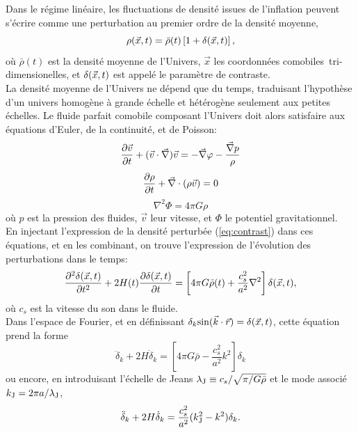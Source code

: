 Dans le régime linéaire, les fluctuations de densité issues de l'inflation peuvent s'écrire comme une perturbation au premier ordre de la densité moyenne,
\begin{equation}
    \label{eq:contrast}
    \rho(\vec{x}, t) = \bar{\rho}(t) \left[1 + \delta(\vec{x}, t) \right],
\end{equation}
où $\bar{\rho}(t)$ est la densité moyenne de l'Univers, $\vec{x}$ les coordonnées comobiles\footnotemark\ tri-dimensionelles, et $\delta(\vec{x}, t)$ est appelé le paramètre de contraste. \\
La densité moyenne de l'Univers ne dépend que du temps, traduisant l'hypothèse d'un univers homogène à grande échelle et hétérogène seulement aux petites échelles.
Le fluide parfait comobile composant l'Univers doit alors satisfaire aux équations d'Euler, de la continuité, et de Poisson:
\begin{equation}
    \frac{\partial \vec{v}}{\partial t} + (\vec{v} \cdot \vec{\nabla}) \vec{v} = -\vec{\nabla}\varphi - \frac{\vec{\nabla}p}{\rho} \label{eq:cosmo:euler}
\end{equation}
\begin{equation}
    \frac{\partial \rho}{\partial t} + \vec{\nabla} \cdot (\rho \vec{v}) = 0 \label{eq:cosmo:conti}
\end{equation}
\begin{equation}
    \nabla^2 \Phi = 4\pi G \rho \label{eq:cosmo:poisson}
\end{equation}
où $p$ est la pression des fluides, $\vec{v}$ leur vitesse, et $\Phi$ le potentiel gravitationnel. \\
En injectant l'expression de la densité perturbée (\ref{eq:contrast}) dans ces équations, et en les combinant, on trouve l'expression de l'évolution des perturbations dans le temps:
\begin{equation}
    \frac{\partial^2 \delta(\vec{x}, t)}{\partial t^2} + 2H(t)\frac{\partial \delta(\vec{x}, t)}{\partial t} = \left[4\pi G \bar{\rho}(t) + \frac{c_s^2}{a^2} \nabla^2\right] \delta(\vec{x}, t),
\end{equation}
où $c_s$ est la vitesse du son dans le fluide. \\
Dans l'espace de Fourier, et en définissant $\delta_k {\rm sin}(\vec{k}\cdot\vec{r}) = \delta(\vec{x}, t)$, cette équation prend la forme
\begin{equation}
    \ddot{\delta}_k + 2H\dot{\delta}_k = \left[4\pi G \bar{\rho} - \frac{c_s^2}{a^2} k^2\right] \delta_k
\end{equation}
ou encore, en introduisant l'échelle de Jeans $\lambda_{\rm J} \equiv c_s / \sqrt{\pi / G\bar{\rho}}$ et le mode associé $k_{\rm J} =2\pi a/\lambda_{\rm J}$,
\begin{equation}
    \label{eq:cosmo:delta_k}
    \ddot{\delta}_k + 2H\dot{\delta}_k = \frac{c_s^2}{a^2} (k_{\rm J}^2 - k^2) \delta_k.
\end{equation}

